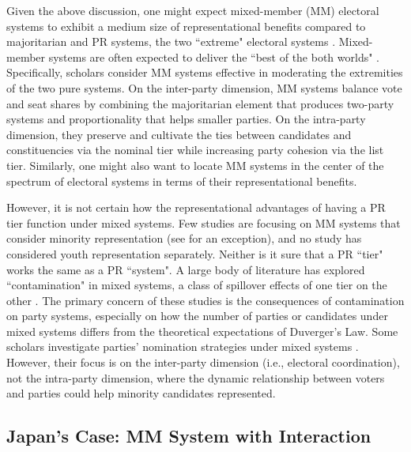 \documentclass[a4paper, 11pt]{article}
\begin{document}
Given the above discussion, one might expect mixed-member (MM) electoral systems to exhibit a medium size of representational benefits compared to majoritarian and PR systems, the two ``extreme" electoral systems \citep{blais_electoral_1996, reynolds_electoral_2005, shugart_mixed-member_2003}. Mixed-member systems are often expected to deliver the ``best of the both worlds" \citep{hirano_policy, shugart_mixed-member_2003}. Specifically, scholars consider MM systems effective in moderating the extremities of the two pure systems. On the inter-party dimension, MM systems balance vote and seat shares by combining the majoritarian element that produces two-party systems and proportionality that helps smaller parties. On the intra-party dimension, they preserve and cultivate the ties between candidates and constituencies via the nominal tier while increasing party cohesion via the list tier. Similarly, one might also want to locate MM systems in the center of the spectrum of electoral systems in terms of their representational benefits. 

However, it is not certain how the representational advantages of having a PR tier function under mixed systems. Few studies are focusing on MM systems that consider minority representation (see \citet{kerevel2019mixed} for an exception), and no study has considered youth representation separately. Neither is it sure that a PR ``tier" works the same as a PR ``system". A large body of literature has explored ``contamination" in mixed systems, a class of spillover effects of one tier on the other \citep{cox_interaction_2002, ferrara_mixed_2005, herron_contamination_2001, nishikawa_mixed_2004, moser_mixed_2004}. The primary concern of these studies is the consequences of contamination on party systems, especially on how the number of parties or candidates under mixed systems differs from the theoretical expectations of Duverger's Law. Some scholars investigate parties' nomination strategies under mixed systems \citep{ferrara_going_2005}. However, their focus is on the inter-party dimension (i.e., electoral coordination), not the intra-party dimension, where the dynamic relationship between voters and parties could help minority candidates represented. 

\subsection{Japan's Case: MM System with Interaction}
\end{document}
